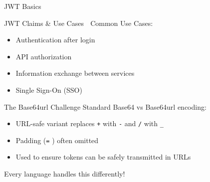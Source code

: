 \documentclass[presentation,aspectratio=169]{beamer}
\begin{document}
\begin{frame}[label={sec:orga2169dd},fragile]{JWT Basics}
\begin{block}{JWT Claims \& Use Cases 🔰}
\alert{Common Use Cases:}
\begin{itemize}
\item Authentication after login
\item API authorization
\item Information exchange between services
\item Single Sign-On (SSO)
\end{itemize}
\end{block}
\begin{block}{The Base64url Challenge}
Standard Base64 vs Base64url encoding:
\begin{itemize}
\item URL-safe variant replaces \texttt{+} with \texttt{-} and \texttt{/} with \texttt{\_}
\item Padding (\texttt{=} ) often omitted
\item Used to ensure tokens can be safely transmitted in URLs
\end{itemize}

\alert{Every language handles this differently!}
\end{block}
\end{frame}
\end{document}
